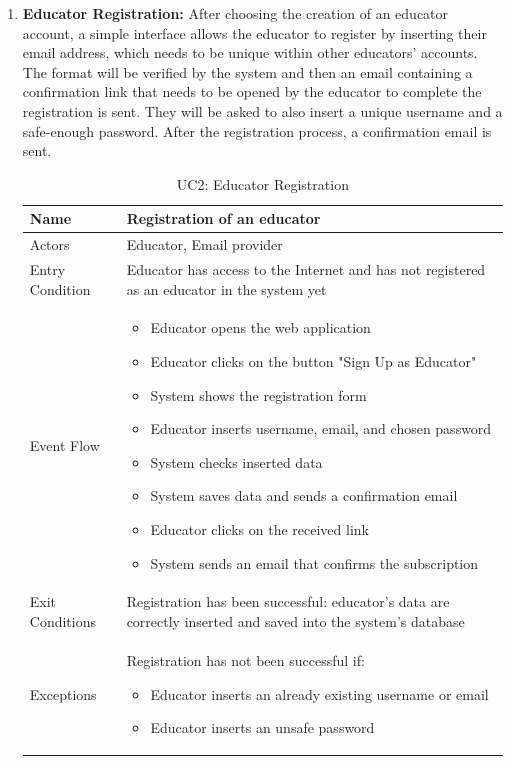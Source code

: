 \begin{enumerate}
   \newpage
   
   \item \textbf{Educator Registration:}
    After choosing the creation of an educator account, a simple interface allows the educator to register by inserting their email address, which needs to be unique within other educators’ accounts. The format will be verified by the system and then an email containing a confirmation link that needs to be opened by the educator to complete the registration is sent. They will be asked to also insert a unique username and a safe-enough password. After the registration process, a confirmation email is sent.
    
   \begin{table}[H]
       \centering
       \begin{tabular}{|l|m{11cm}|}
        \hline
            Name & Registration of an educator\\
        \hline
            Actors & Educator, Email provider\\
        \hline
            Entry Condition & Educator has access to the Internet and has not registered as an educator in the system yet\\
        \hline
            Event Flow & 
            \begin{itemize}
                \item Educator opens the web application
                \item Educator clicks on the button "Sign Up as Educator"
                \item System shows the registration form
                \item Educator inserts username, email, and chosen password
                \item System checks inserted data
                \item System saves data and sends a confirmation email
                \item Educator clicks on the received link
                \item System sends an email that confirms the subscription
            \end{itemize} \\
        \hline
            Exit Conditions & Registration has been successful: educator's data are correctly inserted and saved into the system's database\\
        \hline
            Exceptions & Registration has not been successful if:
            \begin{itemize}
                \item Educator inserts an already existing username or email
                \item Educator inserts an unsafe password
            \end{itemize} \\
        \hline
       \end{tabular}
       \caption{UC2: Educator Registration}
       \label{tab:uc2}
   \end{table}


\end{enumerate}
